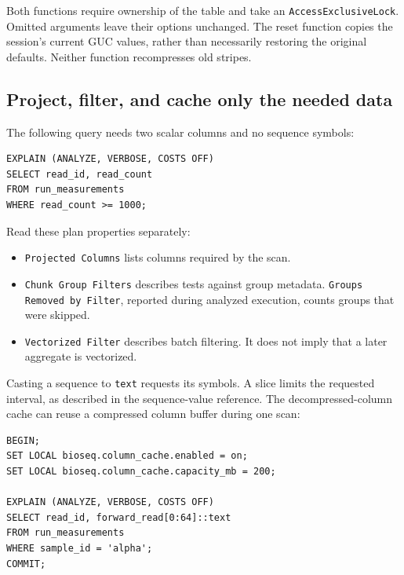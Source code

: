Both functions require ownership of the table and take an
\texttt{AccessExclusiveLock}. Omitted arguments leave their options
unchanged. The reset function copies the session's current GUC values,
rather than necessarily restoring the original defaults. Neither function
recompresses old stripes.

\subsection{Project, filter, and cache only the needed data}

The following query needs two scalar columns and no sequence symbols:

\par\noindent\begin{minipage}{\linewidth}
\begin{lstlisting}[style=bioseq-appendix-sql,
  caption={Inspect column projection and chunk-group filtering.}]
EXPLAIN (ANALYZE, VERBOSE, COSTS OFF)
SELECT read_id, read_count
FROM run_measurements
WHERE read_count >= 1000;
\end{lstlisting}
\end{minipage}

Read these plan properties separately:
\begin{itemize}
  \item \texttt{Projected Columns} lists columns required by the scan.
  \item \texttt{Chunk Group Filters} describes tests against group
    metadata. \texttt{Groups Removed by Filter}, reported during analyzed
    execution, counts groups that were skipped.
  \item \texttt{Vectorized Filter} describes batch filtering. It does not
    imply that a later aggregate is vectorized.
\end{itemize}

Casting a sequence to \texttt{text} requests its symbols. A slice limits
the requested interval, as described in the sequence-value reference.
The decompressed-column cache can reuse a compressed column buffer during
one scan:

\par\noindent\begin{minipage}{\linewidth}
\begin{lstlisting}[style=bioseq-appendix-sql,
  caption={Enable the decompressed-column cache for one transaction.}]
BEGIN;
SET LOCAL bioseq.column_cache.enabled = on;
SET LOCAL bioseq.column_cache.capacity_mb = 200;

EXPLAIN (ANALYZE, VERBOSE, COSTS OFF)
SELECT read_id, forward_read[0:64]::text
FROM run_measurements
WHERE sample_id = 'alpha';
COMMIT;
\end{lstlisting}
\end{minipage}

